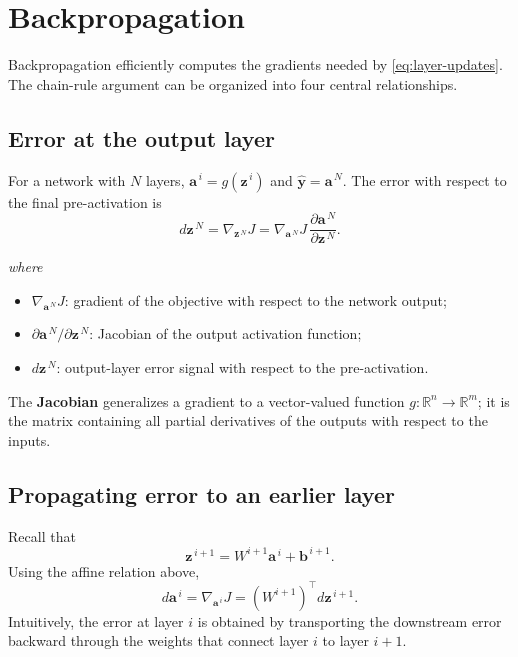 \documentclass[11pt,a4paper]{report}
\newcommand{\vect}[1]{\bm{#1}}
\newcommand{\R}{\mathbb{R}}
\newcommand{\wherelegend}{\par\smallskip\textit{where}\vspace{-0.3em}}
\begin{document}
\section{Backpropagation}

Backpropagation efficiently computes the gradients needed by \cref{eq:layer-updates}. The chain-rule argument can be organized into four central relationships.

\subsection{Error at the output layer}

For a network with $N$ layers, $\vect{a}^{\,i}=g(\vect{z}^{\,i})$ and $\hat{\vect{y}}=\vect{a}^{\,N}$. The error with respect to the final pre-activation is
\begin{equation}
  d\vect{z}^{\,N}
  =\nabla_{\vect{z}^{\,N}}J
  =\nabla_{\vect{a}^{\,N}}J\,
    \frac{\partial \vect{a}^{\,N}}{\partial \vect{z}^{\,N}}.
  \label{eq:backprop1}
\end{equation}
\wherelegend
\begin{itemize}
  \item $\nabla_{\vect{a}^{\,N}}J$: gradient of the objective with respect to the network output;
  \item $\partial \vect{a}^{\,N}/\partial \vect{z}^{\,N}$: Jacobian of the output activation function;
  \item $d\vect{z}^{\,N}$: output-layer error signal with respect to the pre-activation.
\end{itemize}

The \textbf{Jacobian} generalizes a gradient to a vector-valued function $g:\R^n\to\R^m$; it is the matrix containing all partial derivatives of the outputs with respect to the inputs.

\subsection{Propagating error to an earlier layer}

Recall that
\begin{equation}
  \vect{z}^{\,i+1}=W^{i+1}\vect{a}^{\,i}+\vect{b}^{\,i+1}.
\end{equation}
Using the affine relation above,
\begin{equation}
  d\vect{a}^{\,i}
  =\nabla_{\vect{a}^{\,i}}J
  =\left(W^{i+1}\right)^{\top}d\vect{z}^{\,i+1}.
  \label{eq:backprop2}
\end{equation}
Intuitively, the error at layer $i$ is obtained by transporting the downstream error backward through the weights that connect layer $i$ to layer $i+1$.
\end{document}

